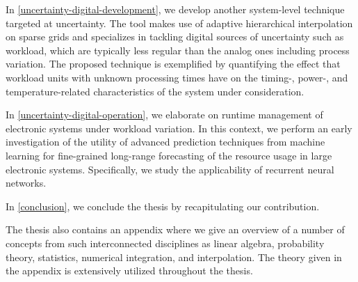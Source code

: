 In \cref{uncertainty-digital-development}, we develop another system-level
technique targeted at uncertainty. The tool makes use of adaptive hierarchical
interpolation on sparse grids and specializes in tackling digital sources of
uncertainty such as workload, which are typically less regular than the analog
ones including process variation. The proposed technique is exemplified by
quantifying the effect that workload units with unknown processing times have on
the timing-, power-, and temperature-related characteristics of the system under
consideration.

In \cref{uncertainty-digital-operation}, we elaborate on runtime management of
electronic systems under workload variation. In this context, we perform an
early investigation of the utility of advanced prediction techniques from
machine learning for fine-grained long-range forecasting of the resource usage
in large electronic systems. Specifically, we study the applicability of
recurrent neural networks.

In \cref{conclusion}, we conclude the thesis by recapitulating our contribution.

The thesis also contains an appendix where we give an overview of a number of
concepts from such interconnected disciplines as linear algebra, probability
theory, statistics, numerical integration, and interpolation. The theory given
in the appendix is extensively utilized throughout the thesis.
